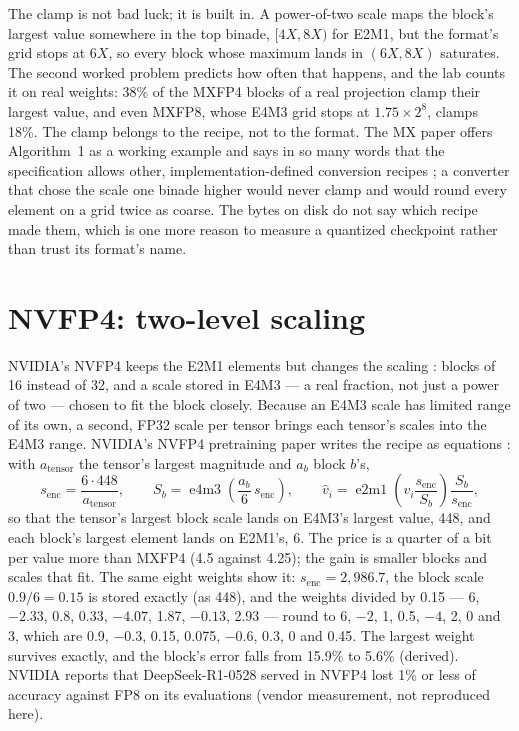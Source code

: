 The clamp is not bad luck; it is built in. A power-of-two scale maps the
block's largest value somewhere in the top binade, $[4X, 8X)$ for E2M1, but the
format's grid stops at $6X$, so every block whose maximum lands in $(6X, 8X)$
saturates. The second worked problem predicts how often that happens, and the
lab counts it on real weights: 38\% of the MXFP4 blocks of a real projection
clamp their largest value, and even MXFP8, whose E4M3 grid stops at
$1.75 \times 2^{8}$, clamps 18\%. The clamp belongs to the recipe, not to the
format. The MX paper offers Algorithm~1 as a working example and says in so many
words that the specification allows other, implementation-defined conversion
recipes \cite{rouhani2023mx}; a converter that chose the scale one binade higher
would never clamp and would round every element on a grid twice as coarse. The
bytes on disk do not say which recipe made them, which is one more reason to
measure a quantized checkpoint rather than trust its format's name.

\section{NVFP4: two-level scaling}

NVIDIA's NVFP4 keeps the E2M1 elements but changes the scaling
\cite{nvidia2025nvfp4}: blocks of 16 instead of 32, and a scale stored in E4M3
--- a real fraction, not just a power of two --- chosen to fit the block
closely. Because an E4M3 scale has limited range of its own, a second, FP32
scale per tensor brings each tensor's scales into the E4M3 range. NVIDIA's
NVFP4 pretraining paper writes the recipe as equations
\cite{nvidia2025nvfp4pretrain}: with $a_{\text{tensor}}$ the tensor's largest
magnitude and $a_b$ block $b$'s,
\begin{equation}
s_{\text{enc}} = \frac{6 \cdot 448}{a_{\text{tensor}}},\qquad
S_b = \operatorname{e4m3}\!\left(\frac{a_b}{6}\, s_{\text{enc}}\right),\qquad
\hat{v}_i = \operatorname{e2m1}\!\left(v_i \frac{s_{\text{enc}}}{S_b}\right)\frac{S_b}{s_{\text{enc}}},
\label{eq:nvfp4}
\end{equation}
so that the tensor's largest block scale lands on E4M3's largest value, 448, and
each block's largest element lands on E2M1's, 6. The price is a quarter of a
bit per value more than MXFP4 (4.5 against 4.25); the gain is smaller blocks and
scales that fit. The same eight weights show it: $s_{\text{enc}} = 2{,}986.7$, the
block scale $0.9/6 = 0.15$ is stored exactly (as 448), and the weights divided by
0.15 --- 6, $-2.33$, 0.8, 0.33, $-4.07$, 1.87, $-0.13$, 2.93 --- round to 6, $-2$, 1,
0.5, $-4$, 2, 0 and 3, which are 0.9, $-0.3$, 0.15, 0.075, $-0.6$, 0.3, 0 and 0.45.
The largest weight survives exactly, and the block's error falls from 15.9\% to
5.6\% (derived). NVIDIA reports that DeepSeek-R1-0528 served in NVFP4 lost 1\%
or less of accuracy against FP8 on its evaluations (vendor measurement, not
reproduced here).

